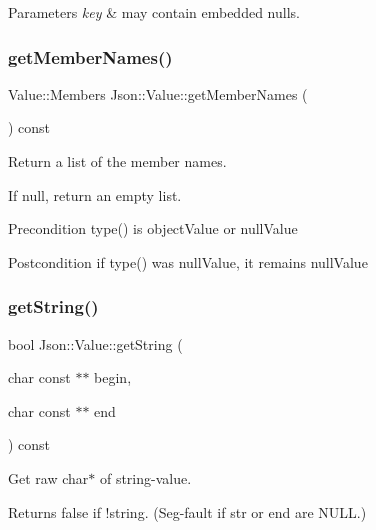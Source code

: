 \begin{DoxyParams}{Parameters}
{\em key} & may contain embedded nulls. \\
\hline
\end{DoxyParams}
\mbox{\label{classJson_1_1Value_a79d7725dce6260317333e69022367ac9}} 
\subsubsection{\texorpdfstring{get\+Member\+Names()}{getMemberNames()}}
{\footnotesize\ttfamily Value\+::\+Members Json\+::\+Value\+::get\+Member\+Names (\begin{DoxyParamCaption}{ }\end{DoxyParamCaption}) const}



Return a list of the member names. 

If null, return an empty list. \begin{DoxyPrecond}{Precondition}
type() is object\+Value or null\+Value 
\end{DoxyPrecond}
\begin{DoxyPostcond}{Postcondition}
if type() was null\+Value, it remains null\+Value 
\end{DoxyPostcond}
\mbox{\label{classJson_1_1Value_a2e1b7be6bde2fe23f15290d9ddbbdf8a}} 
\subsubsection{\texorpdfstring{get\+String()}{getString()}}
{\footnotesize\ttfamily bool Json\+::\+Value\+::get\+String (\begin{DoxyParamCaption}\item[{char const $\ast$$\ast$}]{begin,  }\item[{char const $\ast$$\ast$}]{end }\end{DoxyParamCaption}) const}

Get raw char$\ast$ of string-\/value. \begin{DoxyReturn}{Returns}
false if !string. (Seg-\/fault if str or end are N\+U\+LL.) 
\end{DoxyReturn}
\mbox{\label{classJson_1_1Value_ad6d4df2227321bab05e86667609a7fad}} 
